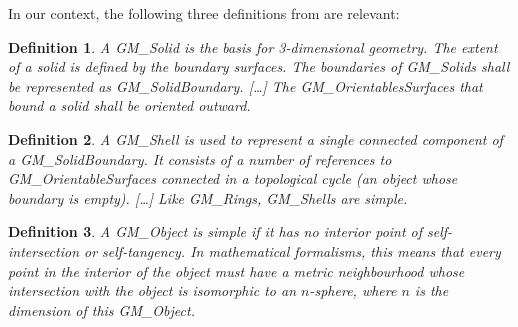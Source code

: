 \documentclass[a4paper,parskip=half,11pt]{scrartcl}
\newtheorem{definition}{Definition}
\begin{document}
In our context, the following three definitions from \citet{ISO19107} are relevant:
\begin{definition}
A GM\_Solid is the basis for 3-dimensional geometry. 
The extent of a solid is defined by the boundary surfaces.
The boundaries of GM\_Solids shall be represented as GM\_SolidBoundary.
[\ldots] 
The GM\_OrientablesSurfaces that bound a solid shall be oriented outward.
\end{definition}
\begin{definition}
A GM\_Shell is used to represent a single connected component of a GM\_SolidBoundary. 
It consists of a number of references to GM\_OrientableSurfaces connected in a topological cycle (an object whose boundary is empty). 
[\ldots] 
Like GM\_Rings, GM\_Shells are simple.
\end{definition}
\begin{definition}
A GM\_Object is \emph{simple} if it has no interior point of self-intersection or self-tangency. 
In mathematical formalisms, this means that every point in the interior of the object must have a metric neighbourhood whose intersection with the object is isomorphic to an $n$-sphere, where $n$ is the dimension of this GM\_Object.
\end{definition}
\end{document}
